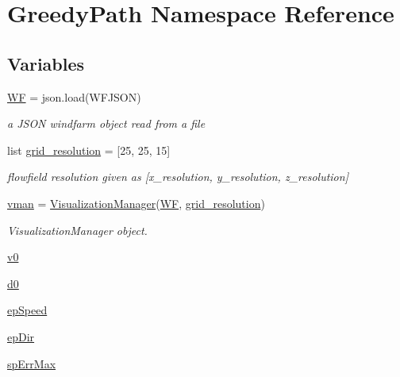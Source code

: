 \hypertarget{namespace_greedy_path}{}\section{Greedy\+Path Namespace Reference}
\label{namespace_greedy_path}
\subsection*{Variables}
\begin{DoxyCompactItemize}
\item 
\mbox{\hyperlink{namespace_greedy_path_a23138d42757308a7b4324002f60d751a}{WF}} = json.\+load(W\+F\+J\+S\+ON)
\begin{DoxyCompactList}\small\item\em a J\+S\+ON windfarm object read from a file \end{DoxyCompactList}\item 
list \mbox{\hyperlink{namespace_greedy_path_a1d2a41e131ea92ec827544055660645d}{grid\+\_\+resolution}} = \mbox{[}25, 25, 15\mbox{]}
\begin{DoxyCompactList}\small\item\em flowfield resolution given as \mbox{[}x\+\_\+resolution, y\+\_\+resolution, z\+\_\+resolution\mbox{]} \end{DoxyCompactList}\item 
\mbox{\hyperlink{namespace_greedy_path_a0b686e13d9e46e185e611dc0b5d92e8f}{vman}} = \mbox{\hyperlink{classvisualization__manager___d_j_1_1_visualization_manager}{Visualization\+Manager}}(\mbox{\hyperlink{namespace_greedy_path_a23138d42757308a7b4324002f60d751a}{WF}}, \mbox{\hyperlink{namespace_greedy_path_a1d2a41e131ea92ec827544055660645d}{grid\+\_\+resolution}})
\begin{DoxyCompactList}\small\item\em Visualization\+Manager object. \end{DoxyCompactList}\item 
\mbox{\hyperlink{namespace_greedy_path_ac3503601b08d4fc59e5cbc91d32492f0}{v0}}
\item 
\mbox{\hyperlink{namespace_greedy_path_a3dd8a5c17eb3ef664131b4d0070b61f8}{d0}}
\item 
\mbox{\hyperlink{namespace_greedy_path_a5d30db54ed4660997cad7a99db0ae3d5}{ep\+Speed}}
\item 
\mbox{\hyperlink{namespace_greedy_path_a8e7645c081a51673f166a72dec83f08e}{ep\+Dir}}
\item 
\mbox{\hyperlink{namespace_greedy_path_ac15dd3310629c8a8e6be44d3a182f356}{sp\+Err\+Max}}

\end{DoxyCompactItemize}
